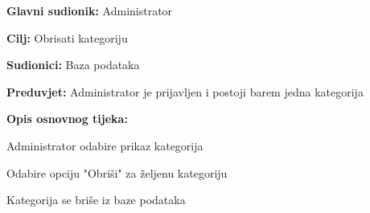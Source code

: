 					\noindent {}
					\begin{packed_item}
						
						\item \textbf{Glavni sudionik:} Administrator
						\item  \textbf{Cilj:} Obrisati kategoriju
						\item  \textbf{Sudionici:} Baza podataka
						\item  \textbf{Preduvjet:} Administrator je prijavljen i postoji barem jedna kategorija
						\item  \textbf{Opis osnovnog tijeka:}
						
						\item[] \begin{packed_enum}
							
							\item Administrator odabire prikaz kategorija
							\item Odabire opciju "Obriši" za željenu kategoriju
							\item Kategorija se briše iz baze podataka
							
						\end{packed_enum}
						
					\end{packed_item}
				
